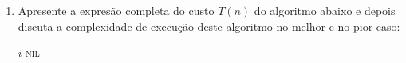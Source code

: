 \documentclass[9pt,a4paper]{extarticle}
\begin{document}
\begin{enumerate}
  \begin{algorithmic}[1]
      \State $key \gets A[j]$
      \State $i \gets j - 1$
          \State $A[i + 1] \gets A[i]$
          \State $i \gets i - 1$
      \EndWhile
      \State $A[i + 1] \gets key$
  \EndFor
  \end{algorithmic}
  \item Apresente a expresão completa do custo $T(n)$ do algoritmo abaixo e depois discuta a complexidade de execução deste algoritmo no melhor e no pior caso:
  \begin{algorithmic}[1]
              \State \Return $i$
          \EndIf
      \EndFor
      \State \Return \textsc{nil}
  \EndProcedure
  \end{algorithmic}
  \end{enumerate}
\end{document}
